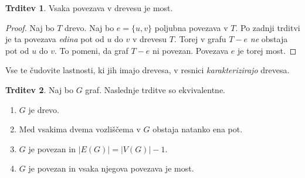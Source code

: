 \documentclass[11pt]{book}
\theoremstyle{definition}
\theoremstyle{zgled}
\theoremstyle{odprtproblem}
\theoremstyle{domacanaloga}
\newenvironment{dokaz}
    {\color{siva}\begin{proof}}
    {\end{proof}}
\theoremstyle{izrek}
\newtheorem*{trditev}{Trditev}
\begin{document}
\begin{trditev}
Vsaka povezava v drevesu je most.
\end{trditev}
\begin{dokaz}
    Naj bo $T$ drevo. Naj bo $e = \{ u, v \}$ poljubna povezava v $T$. Po zadnji trditvi je ta povezava \emph{edina} pot od $u$ do $v$ v drevesu $T$. Torej v grafu $T - e$ \emph{ne} obstaja pot od $u$ do $v$. To pomeni, da graf $T - e$ ni povezan. Povezava $e$ je torej most.
\end{dokaz}

Vse te čudovite lastnosti, ki jih imajo drevesa, v resnici \emph{karakterizirajo} drevesa.

\begin{trditev}
    Naj bo $G$ graf. Naslednje trditve so ekvivalentne.
    \begin{enumerate}
        \item $G$ je drevo.
        \item Med vsakima dvema vozliščema v $G$ obstaja natanko ena pot.
        \item $G$ je povezan in $|E(G)| = |V(G)| - 1$.
        \item $G$ je povezan in vsaka njegova povezava je most.
    \end{enumerate}
\end{trditev}
\end{document}
